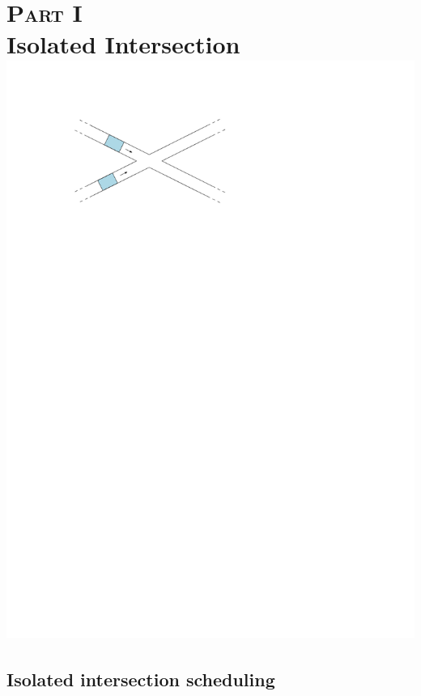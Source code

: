 \documentclass[a4paper]{report}
\theoremstyle{definition}
\theoremstyle{plain}
\begin{document}
\part*{\hspace*{-0.8em}\textsc{Part I}\\[0.6em] Isolated Intersection\\[3em]
       \centering\includegraphics[scale=1]{figures/intersection-non-axis-aligned}}



\chapter{Isolated intersection scheduling}\label{chap:single}

\end{document}
